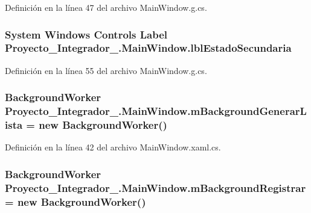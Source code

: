 Definición en la línea 47 del archivo Main\-Window.\-g.\-cs.

\hypertarget{class_proyecto___integrador__3_1_1_main_window_ab3c46fae3b8ee53389013b8cc0426f77}{
\subsubsection[{lbl\-Estado\-Secundaria}]{\setlength{\rightskip}{0pt plus 5cm}System Windows Controls Label Proyecto\-\_\-\-Integrador\-\_.\-Main\-Window.\-lbl\-Estado\-Secundaria\hspace{0.3cm}{\ttfamily [package]}}}\label{class_proyecto___integrador__3_1_1_main_window_ab3c46fae3b8ee53389013b8cc0426f77}


Definición en la línea 55 del archivo Main\-Window.\-g.\-cs.

\hypertarget{class_proyecto___integrador__3_1_1_main_window_a8c7bc6dfcff68ff1ad690fead87313b0}{
\subsubsection[{m\-Background\-Generar\-Lista}]{\setlength{\rightskip}{0pt plus 5cm}Background\-Worker Proyecto\-\_\-\-Integrador\-\_.\-Main\-Window.\-m\-Background\-Generar\-Lista = new Background\-Worker()\hspace{0.3cm}{\ttfamily [private]}}}\label{class_proyecto___integrador__3_1_1_main_window_a8c7bc6dfcff68ff1ad690fead87313b0}


Definición en la línea 42 del archivo Main\-Window.\-xaml.\-cs.

\hypertarget{class_proyecto___integrador__3_1_1_main_window_aabcce21ca35108e6a3ab08f14883cdf2}{
\subsubsection[{m\-Background\-Registrar}]{\setlength{\rightskip}{0pt plus 5cm}Background\-Worker Proyecto\-\_\-\-Integrador\-\_.\-Main\-Window.\-m\-Background\-Registrar = new Background\-Worker()\hspace{0.3cm}{\ttfamily [private]}}}\label{class_proyecto___integrador__3_1_1_main_window_aabcce21ca35108e6a3ab08f14883cdf2}


